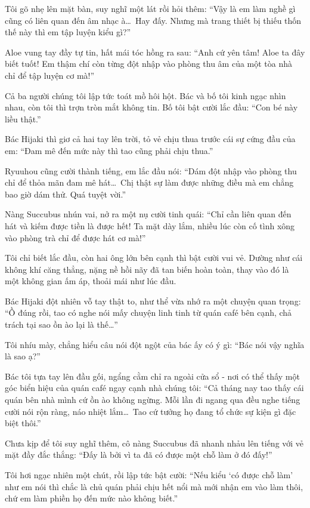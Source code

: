 \documentclass[../main.tex]{subfiles}
\begin{document}
Tôi gõ nhẹ lên mặt bàn, suy nghĩ một lát rồi hỏi thêm: ``Vậy là em làm nghề gì cũng có liên quan đến âm nhạc à\dots\ Hay đấy. Nhưng mà trang thiết bị thiếu thốn thế này thì em tập luyện kiểu gì?''

Aloe vung tay đầy tự tin, hất mái tóc hồng ra sau: ``Anh cứ yên tâm! Aloe ta đây biết tuốt! Em thậm chí còn từng đột nhập vào phòng thu âm của một tòa nhà chỉ để tập luyện cơ mà!''

Cả ba người chúng tôi lập tức toát mồ hôi hột. Bác và bố tôi kinh ngạc nhìn nhau, còn tôi thì trợn tròn mắt không tin. Bố tôi bật cười lắc đầu: ``Con bé này liều thật.''

Bác Hijaki thì giơ cả hai tay lên trời, tỏ vẻ chịu thua trước cái sự cứng đầu của em: ``Đam mê đến mức này thì tao cũng phải chịu thua.''

Ryuuhou cũng cười thành tiếng, em lắc đầu nói: ``Dám đột nhập vào phòng thu chỉ để thỏa mãn đam mê hát\dots\ Chị thật sự làm được những điều mà em chẳng bao giờ dám thử. Quá tuyệt vời.''

Nàng Succubus nhún vai, nở ra một nụ cười tinh quái: ``Chỉ cần liên quan đến hát và kiếm được tiền là được hết! Ta mặt dày lắm, nhiều lúc còn cố tình xông vào phòng trà chỉ để được hát cơ mà!''

Tôi chỉ biết lắc đầu, còn hai ông lớn bên cạnh thì bật cười vui vẻ. Dường như cái không khí căng thẳng, nặng nề hồi nãy đã tan biến hoàn toàn, thay vào đó là một không gian ấm áp, thoải mái như lúc đầu.

Bác Hijaki đột nhiên vỗ tay thật to, như thể vừa nhớ ra một chuyện quan trọng: ``Ồ đúng rồi, tao có nghe nói mấy chuyện linh tinh từ quán café bên cạnh, chả trách tại sao ồn ào lại là thế\dots''

Tôi nhíu mày, chẳng hiểu câu nói đột ngột của bác ấy có ý gì: ``Bác nói vậy nghĩa là sao ạ?''

Bác tôi tựa tay lên đầu gối, ngẩng cằm chỉ ra ngoài cửa sổ - nơi có thể thấy một góc biển hiệu của quán café ngay cạnh nhà chúng tôi: ``Cả tháng nay tao thấy cái quán bên nhà mình cứ ồn ào không ngừng. Mỗi lần đi ngang qua đều nghe tiếng cười nói rộn ràng, náo nhiệt lắm\dots\ Tao cứ tưởng họ đang tổ chức sự kiện gì đặc biệt thôi.''

Chưa kịp để tôi suy nghĩ thêm, cô nàng Succubus đã nhanh nhảu lên tiếng với vẻ mặt đầy đắc thắng: ``Đấy là bởi vì ta đã có được một chỗ làm ở đó đấy!''

Tôi hơi ngạc nhiên một chút, rồi lập tức bật cười: ``Nếu kiểu `có được chỗ làm' như em nói thì chắc là chủ quán phải chịu hết nổi mà mới nhận em vào làm thôi, chứ em làm phiền họ đến mức nào không biết.''
\end{document}
